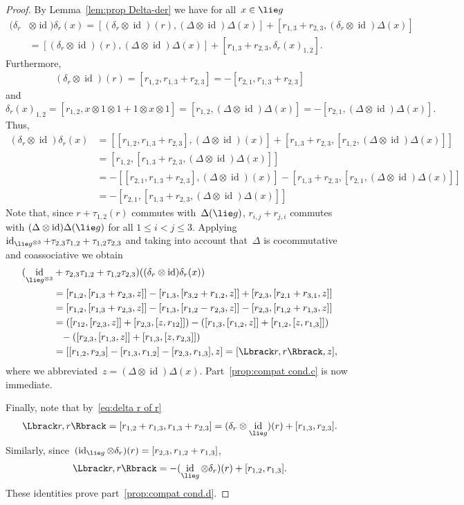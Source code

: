 \documentclass[12pt, reqno]{amsart}
\newcommand{\cybe}[1]{\mathbb{\Lbrack}#1,#1\mathbb{\Rbrack}}
\theoremstyle{definition}
\numberwithin{equation}{section}
\newcommand{\tensor}{\otimes}
\DeclareMathOperator{\id}{id}
\begin{document}
\begin{proof}
By Lemma~\ref{lem:prop Delta-der} we have
for all~$x\in\lie g$
\begin{align*}
(\delta_{r}&\tensor\id)\delta_{r}(x)
=[(\delta_{r}\tensor\id)(r),(\Delta\tensor\id)\Delta(x)]+[r_{1,3}+r_{2,3},(\delta_{r}\tensor \id)\Delta(x)]\\
&=[(\delta_{r}\tensor\id)(r),(\Delta\tensor\id)\Delta(x)]+[r_{1,3}+r_{2,3},\delta_{r}(x)_{1,2}].
\end{align*}
Furthermore, 
\begin{align}\label{eq:delta r of r}
(\delta_{r}\tensor\id)(r)=[r_{1,2},r_{1,3}+r_{2,3}]=-[r_{2,1},r_{1,3}+r_{2,3}]
\end{align}
and
$$
\delta_{r}(x)_{1,2}=
[r_{1,2},x\tensor 1\tensor 1+1\tensor x\tensor 1]=
[r_{1,2},(\Delta\tensor \id)\Delta(x)]=-[r_{2,1},(\Delta\tensor\id)\Delta(x)].
$$
Thus, 
\begin{align*}
(\delta_{r}\tensor\id)\delta_{r}(x)&=
[[r_{1,2},r_{1,3}+r_{2,3}],(\Delta\tensor\id)(x)]+
[r_{1,3}+r_{2,3},[r_{1,2},(\Delta\tensor\id)\Delta(x)]]\\
&=[r_{1,2},[r_{1,3}+r_{2,3},(\Delta\tensor\id)\Delta(x)]]\\
&=-[[r_{2,1},r_{1,3}+r_{2,3}],(\Delta\tensor\id)(x)]-
[r_{1,3}+r_{2,3},[r_{2,1},(\Delta\tensor\id)\Delta(x)]]\\
&=-[r_{2,1},[r_{1,3}+r_{2,3},(\Delta\tensor\id)\Delta(x)]]
\end{align*}
Note that, since $r+\tau_{1,2}(r)$ commutes with~$\Delta(\lie g)$, 
$r_{i,j}+r_{j,i}$ commutes with $(\Delta\tensor\id)\Delta(\lie g)$ for all $1\le i<j\le 3$. 
Applying $\id_{\lie g^{\tensor 3}}+\tau_{2,3}\tau_{1,2}+\tau_{1,2}\tau_{2,3}$ 
and taking into account that~$\Delta$ is cocommutative and coassociative we obtain
\begin{align*}
(\id_{\lie g^{\tensor 3}}&+\tau_{2,3}\tau_{1,2}+\tau_{1,2}\tau_{2,3})((\delta_{r}\tensor\id)\delta_{r}(x))\\
&=[r_{1,2},[r_{1,3}+r_{2,3},z]]
-[r_{1,3},[r_{3,2}+r_{1,2},z]]+[r_{2,3},[r_{2,1}+r_{3,1},z]]
\\
&=[r_{1,2},[r_{1,3}+r_{2,3},z]]-
[r_{1,3},[r_{1,2}-r_{2,3},z]]-[r_{2,3},[r_{1,2}+r_{1,3},z]]\\
&=([r_{12},[r_{2,3},z]]+[r_{2,3},[z,r_{12}]])
-([r_{1,3},[r_{1,2},z]]+
[r_{1,2},[z,r_{1,3}]])\\
&\phantom{=}-([r_{2,3},[r_{1,3},z]]+[r_{1,3},[z,r_{2,3}]])\\
&=[ [r_{1,2},r_{2,3}]
-[r_{1,3},r_{1,2}]
-[r_{2,3},r_{1,3}],z]
=[\cybe{r},z],
\end{align*}
where we abbreviated~$z=(\Delta\tensor\id)\Delta(x)$. Part~\ref{prop:compat cond.c} is now immediate.

Finally, note that by~\eqref{eq:delta r of r}
$$
\cybe{r}=[r_{1,2}+r_{1,3},r_{1,3}+r_{2,3}]
=(\delta_{r}\tensor\id_{\lie g})(r)+[r_{1,3},r_{2,3}].
$$
Similarly, since~$(\id_{\lie g}\tensor \delta_{r})(r)=
[r_{2,3},r_{1,2}+r_{1,3}]$,
$$
\cybe{r}=-(\id_{\lie g}\tensor\delta_{r})(r)+[r_{1,2},r_{1,3}].
$$
These identities prove part~\ref{prop:compat cond.d}.
\end{proof}
\end{document}
